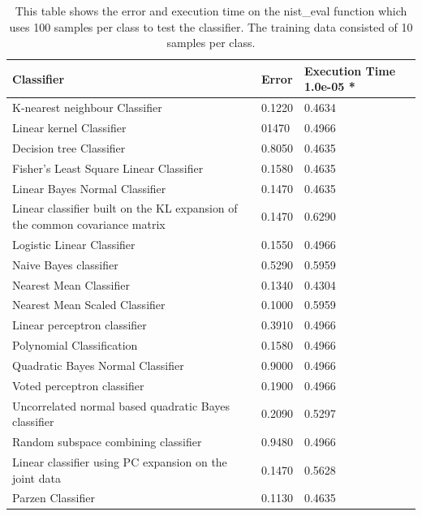 \documentclass[%
        compressed,
        final,
        notitlepage,
        narroweqnarray,
        inline,
        twoside,
        ]{ieee}
\begin{document}
\begin{table}
    \begin{tabular} {p{5cm}lp{1.5cm}} %
        \hline
    Classifier & Error & Execution Time 1.0e-05 * \\
        \hline
K-nearest neighbour Classifier & 0.1220 & 0.4634 \\
Linear kernel Classifier & 01470 & 0.4966 \\
Decision tree Classifier & 0.8050 & 0.4635 \\
Fisher's Least Square Linear Classifier & 0.1580 & 0.4635 \\
Linear Bayes Normal Classifier & 0.1470 & 0.4635 \\
Linear classifier built on the KL expansion of the common covariance matrix & 0.1470 & 0.6290 \\
Logistic Linear Classifier & 0.1550 & 0.4966 \\
Naive Bayes classifier & 0.5290 & 0.5959 \\
Nearest Mean Classifier & 0.1340 & 0.4304 \\
Nearest Mean Scaled Classifier & 0.1000 & 0.5959 \\
Linear perceptron classifier & 0.3910 & 0.4966 \\
Polynomial Classification & 0.1580 & 0.4966 \\
Quadratic Bayes Normal Classifier & 0.9000 & 0.4966 \\
Voted perceptron classifier & 0.1900 & 0.4966 \\
Uncorrelated normal based quadratic Bayes classifier & 0.2090 & 0.5297 \\
Random subspace combining classifier & 0.9480 & 0.4966 \\
Linear classifier using PC expansion on the joint data & 0.1470 & 0.5628 \\
Parzen Classifier & 0.1130 & 0.4635 \\
        \hline
    \end{tabular}
    \caption{
        This table shows the error and execution time on the nist\_eval function
        which uses 100 samples per class to test the classifier. The training
        data consisted of 10 samples per class. }
\end{table}
\end{document}

